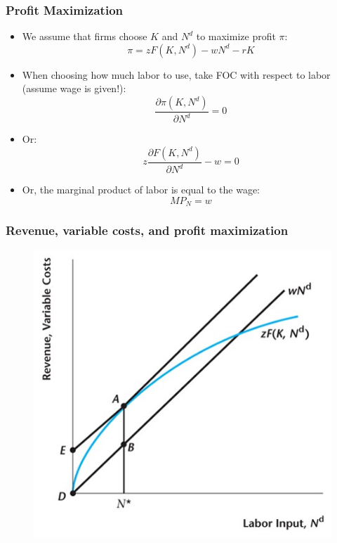 \documentclass{beamer}
\begin{document}
\begin{frame}
\frametitle[alignment=center]{Profit Maximization}
\begin{itemize}
\item We assume that firms choose  $K$ and $N^d$ to maximize profit $\pi$:
$$\pi=zF(K,N^d)-wN^d-rK$$
\item When choosing how much labor to use, take FOC with respect to labor (assume wage is given!):
$$\frac{\partial \pi(K,N^d)}{\partial N^d}=0$$
\item Or:
$$z\frac{\partial F(K,N^d)}{\partial N^d}-w=0$$
\item Or, the marginal product of labor is equal to the wage:
$$MP_N=w$$
\end{itemize}
\end{frame}

\begin{frame}
\frametitle[alignment=center]{Revenue, variable costs, and profit maximization}
\begin{figure}
\centering
\includegraphics[scale=0.5]{Figures/W_Fig_4pt19.png}
\end{figure}
\end{frame}
\end{document}
